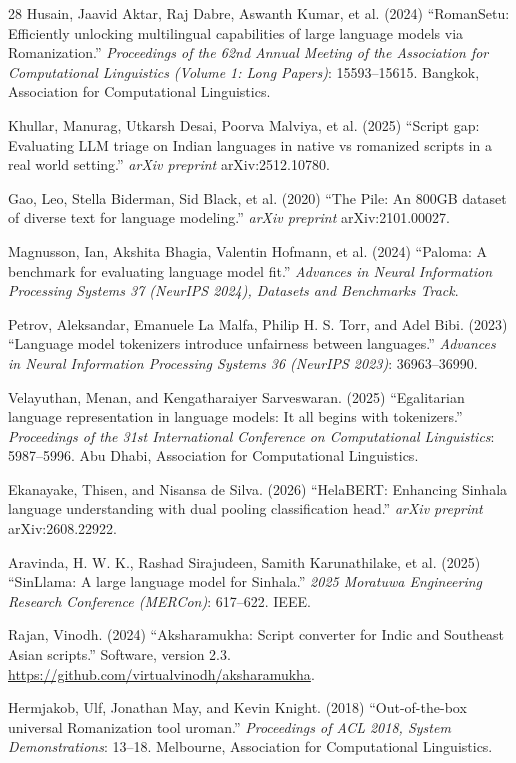 \documentclass[3p,times,procedia]{elsarticle}
\begin{document}
\begin{thebibliography}{28}
Husain, Jaavid Aktar, Raj Dabre, Aswanth Kumar, et al. (2024) ``RomanSetu: Efficiently unlocking multilingual capabilities of large language models via Romanization.'' {\it Proceedings of the 62nd Annual Meeting of the Association for Computational Linguistics (Volume 1: Long Papers)}: 15593--15615. Bangkok, Association for Computational Linguistics.

Khullar, Manurag, Utkarsh Desai, Poorva Malviya, et al. (2025) ``Script gap: Evaluating LLM triage on Indian languages in native vs romanized scripts in a real world setting.'' {\it arXiv preprint} arXiv:2512.10780.

Gao, Leo, Stella Biderman, Sid Black, et al. (2020) ``The Pile: An 800GB dataset of diverse text for language modeling.'' {\it arXiv preprint} arXiv:2101.00027.

Magnusson, Ian, Akshita Bhagia, Valentin Hofmann, et al. (2024) ``Paloma: A benchmark for evaluating language model fit.'' {\it Advances in Neural Information Processing Systems 37 (NeurIPS 2024), Datasets and Benchmarks Track}.

Petrov, Aleksandar, Emanuele La Malfa, Philip H. S. Torr, and Adel Bibi. (2023) ``Language model tokenizers introduce unfairness between languages.'' {\it Advances in Neural Information Processing Systems 36 (NeurIPS 2023)}: 36963--36990.

Velayuthan, Menan, and Kengatharaiyer Sarveswaran. (2025) ``Egalitarian language representation in language models: It all begins with tokenizers.'' {\it Proceedings of the 31st International Conference on Computational Linguistics}: 5987--5996. Abu Dhabi, Association for Computational Linguistics.

Ekanayake, Thisen, and Nisansa de Silva. (2026) ``HelaBERT: Enhancing Sinhala language understanding with dual pooling classification head.'' {\it arXiv preprint} arXiv:2608.22922.

Aravinda, H. W. K., Rashad Sirajudeen, Samith Karunathilake, et al. (2025) ``SinLlama: A large language model for Sinhala.'' {\it 2025 Moratuwa Engineering Research Conference (MERCon)}: 617--622. IEEE.

Rajan, Vinodh. (2024) ``Aksharamukha: Script converter for Indic and Southeast Asian scripts.'' Software, version 2.3. \url{https://github.com/virtualvinodh/aksharamukha}.

Hermjakob, Ulf, Jonathan May, and Kevin Knight. (2018) ``Out-of-the-box universal Romanization tool uroman.'' {\it Proceedings of ACL 2018, System Demonstrations}: 13--18. Melbourne, Association for Computational Linguistics.


\end{thebibliography}
\end{document}
